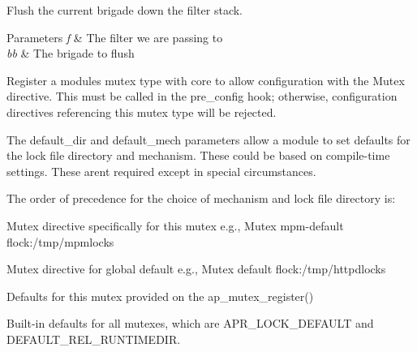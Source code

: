 Flush the current brigade down the filter stack. 
\begin{DoxyParams}{Parameters}
{\em f} & The filter we are passing to \\
\hline
{\em bb} & The brigade to flush\\
\hline
\end{DoxyParams}
Register a module\textquotesingle{}s mutex type with core to allow configuration with the Mutex directive. This must be called in the pre\+\_\+config hook; otherwise, configuration directives referencing this mutex type will be rejected.

The default\+\_\+dir and default\+\_\+mech parameters allow a module to set defaults for the lock file directory and mechanism. These could be based on compile-\/time settings. These aren\textquotesingle{}t required except in special circumstances.

The order of precedence for the choice of mechanism and lock file directory is\+:


\begin{DoxyEnumerate}
\item Mutex directive specifically for this mutex e.\+g., Mutex mpm-\/default flock\+:/tmp/mpmlocks
\item Mutex directive for global default e.\+g., Mutex default flock\+:/tmp/httpdlocks
\item Defaults for this mutex provided on the ap\+\_\+mutex\+\_\+register()
\item Built-\/in defaults for all mutexes, which are A\+P\+R\+\_\+\+L\+O\+C\+K\+\_\+\+D\+E\+F\+A\+U\+LT and D\+E\+F\+A\+U\+L\+T\+\_\+\+R\+E\+L\+\_\+\+R\+U\+N\+T\+I\+M\+E\+D\+IR.
\end{DoxyEnumerate}


